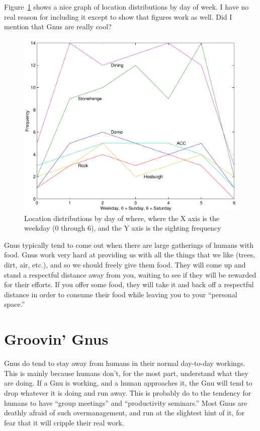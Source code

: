 Figure~\ref{fig:bogus3} shows a nice graph of location distributions
by day of week.  I have no real reason for including it except to show
that figures work as well.  Did I mention that Gnus are really cool?

\begin{figure}[tpb]
  \begin{center}
    \centerline{\includegraphics[scale=0.8]{sample_nd}}
    \caption{Location distributions by day of where, where the X axis
      is the weekday (0 through 6), and the Y axis is the sighting
      frequency}
    \label{fig:bogus3}
  \end{center}
\end{figure}

Gnus typically tend to come out when there are large gatherings of
humans with food.  Gnus work very hard at providing us with all the
things that we like (trees, dirt, air, etc.), and so we should freely
give them food.  They will come up and stand a respectful distance
away from you, waiting to see if they will be rewarded for their
efforts.  If you offer some food, they will take it and back off a
respectful distance in order to consume their food while leaving you
to your ``personal space.''  

\section{Groovin' Gnus}
\label{sec:groovin-gnus}

Gnus do tend to stay away from humans in their normal day-to-day
workings.  This is mainly because humans don't, for the most part,
understand what they are doing.  If a Gnu is working, and a human
approaches it, the Gnu will tend to drop whatever it is doing and run
away.  This is probably do to the tendency for humans to have ``group
meetings'' and ``productivity seminars.''  Most Gnus are deathly
afraid of such overmanagement, and run at the slightest hint of it,
for fear that it will cripple their real work.

